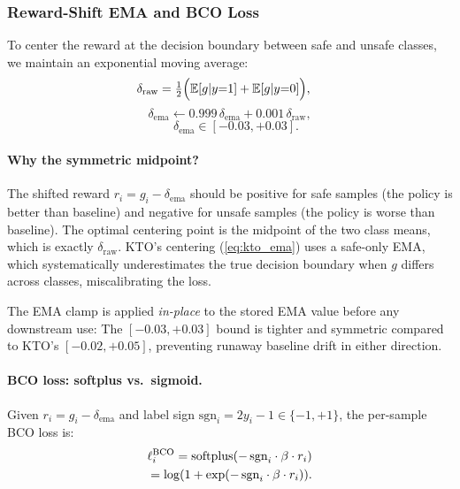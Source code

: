 \subsubsection{Reward-Shift EMA and BCO Loss}

To center the reward at the decision boundary between safe and unsafe
classes, we maintain an exponential moving average:
\begin{align}
  \delta_\text{raw} &= \tfrac{1}{2}
    \Big(\mathbb{E}[g | y{=}1] + \mathbb{E}[g | y{=}0]\Big), \notag
    \label{eq:delta_raw} 
\end{align}
\[
  \delta_\text{ema} \leftarrow
    0.999\,\delta_\text{ema} + 0.001\,\delta_\text{raw}, \label{eq:delta_ema_1}
\]
\[
  \quad \delta_\text{ema} \in [-0.03, +0.03]. \label{eq:delta_ema_2}
\]

\paragraph{Why the symmetric midpoint?}
The shifted reward $r_i = g_i - \delta_\text{ema}$ should be positive for
safe samples (the policy is better than baseline) and negative for unsafe
samples (the policy is worse than baseline).
The optimal centering point is the midpoint of the two class means, which is
exactly $\delta_\text{raw}$.
KTO's centering (\eqref{eq:kto_ema}) uses a safe-only EMA, which
systematically underestimates the true decision boundary when $g$ differs
across classes, miscalibrating the loss.

The EMA clamp is applied \emph{in-place} to the stored EMA value before any downstream use:
The $[-0.03, +0.03]$ bound is tighter and symmetric compared to KTO's $[-0.02, +0.05]$, preventing runaway baseline drift in either direction.

\paragraph{BCO loss: softplus vs.\ sigmoid.}
Given $r_i = g_i - \delta_\text{ema}$ and label sign
$\text{sgn}_i = 2y_i - 1 \in \{-1, +1\}$, the per-sample BCO loss is:
\begin{equation}
\begin{aligned}
  \ell^\text{BCO}_i = \mathrm{softplus}(-\,\text{sgn}_i \cdot \beta \cdot r_i)
  \\= \log(1 + \exp(-\,\text{sgn}_i \cdot \beta \cdot r_i)). \notag
  \label{eq:bco_loss}
\end{aligned}
\end{equation}

